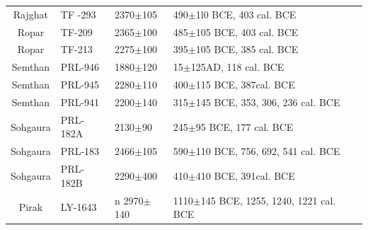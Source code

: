 {{{\begin{longtable}{|c|p{1.1cm}|p{1.2cm}|p{1.8cm}|p{3.3cm}|}
Rajghat & TF -293 & 2370$\pm$105 & 490$\pm$1l0 BCE, 403 cal. BCE & \\
Ropar & TF-209 & 2365$\pm$100 & 485$\pm$105 BCE, 403 cal. BCE & \\
Ropar & TF-213 & 2275$\pm$100 & 395$\pm$105 BCE, 385 cal. BCE & \\
Semthan & PRL-946 & 1880$\pm$120 &15$\pm$125AD, 118 cal. BCE &\\
Semthan & PRL-945 & 2280$\pm$110 & 400$\pm$115 BCE, 387cal. BCE & \\
Semthan & PRL-941 & 2200$\pm$140 & 315$\pm$145 BCE, 353, 306, 236 cal. BCE &\\
Sohgaura & PRL-182A & 2130$\pm$90 & 245$\pm$95 BCE, 177 cal. BCE & \\
Sohgaura & PRL-183 & 2466$\pm$105 & 590$\pm$110 BCE, 756, 692, 541 cal. BCE &\\
Sohgaura & PRL-182B & 2290$\pm$400 & 410$\pm$410 BCE, 391cal. BCE &\\
Pirak & LY-1643 &n 2970$\pm$140 & 1110$\pm$145 BCE, 1255, 1240, 1221 cal. BCE&\\
\hline
\end{longtable}
}}

}
